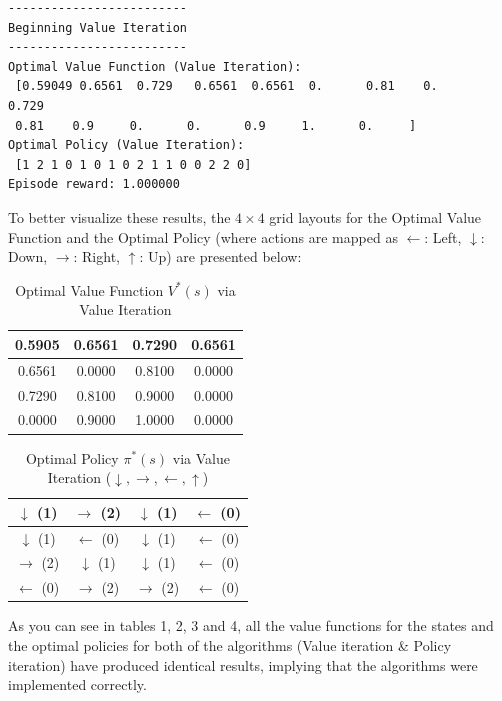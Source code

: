 \documentclass{article}
\begin{document}
\begin{enumerate}
\begin{verbatim}
-------------------------
Beginning Value Iteration
-------------------------
Optimal Value Function (Value Iteration):
 [0.59049 0.6561  0.729   0.6561  0.6561  0.      0.81    0.      0.729
 0.81    0.9     0.      0.      0.9     1.      0.     ]
Optimal Policy (Value Iteration):
 [1 2 1 0 1 0 1 0 2 1 1 0 0 2 2 0]
Episode reward: 1.000000
\end{verbatim}

To better visualize these results, the $4 \times 4$ grid layouts for the Optimal Value Function and the Optimal Policy (where actions are mapped as $\leftarrow$: Left, $\downarrow$: Down, $\rightarrow$: Right, $\uparrow$: Up) are presented below:

\begin{table}[htbp]
\centering
\caption{Optimal Value Function $V^*(s)$ via Value Iteration}
\begin{tabular}{|c|c|c|c|}
\hline
0.5905 & 0.6561 & 0.7290 & 0.6561 \\ \hline
0.6561 & 0.0000 & 0.8100 & 0.0000 \\ \hline
0.7290 & 0.8100 & 0.9000 & 0.0000 \\ \hline
0.0000 & 0.9000 & 1.0000 & 0.0000 \\ \hline
\end{tabular}
\end{table}

\begin{table}[htbp]
\centering
\caption{Optimal Policy $\pi^*(s)$ via Value Iteration ($\downarrow, \rightarrow, \leftarrow, \uparrow$)}
\begin{tabular}{|c|c|c|c|}
\hline
$\downarrow$ (1) & $\rightarrow$ (2) & $\downarrow$ (1) & $\leftarrow$ (0) \\ \hline
$\downarrow$ (1) & $\leftarrow$ (0) & $\downarrow$ (1) & $\leftarrow$ (0) \\ \hline
$\rightarrow$ (2) & $\downarrow$ (1) & $\downarrow$ (1) & $\leftarrow$ (0) \\ \hline
$\leftarrow$ (0) & $\rightarrow$ (2) & $\rightarrow$ (2) & $\leftarrow$ (0) \\ \hline
\end{tabular}
\end{table} 



As you can see in tables 1, 2, 3 and 4, all the value functions for the states and the optimal policies for both of the algorithms (Value iteration \& Policy iteration) have produced identical results, implying that the algorithms were implemented correctly.

\end{enumerate}
\end{document}
